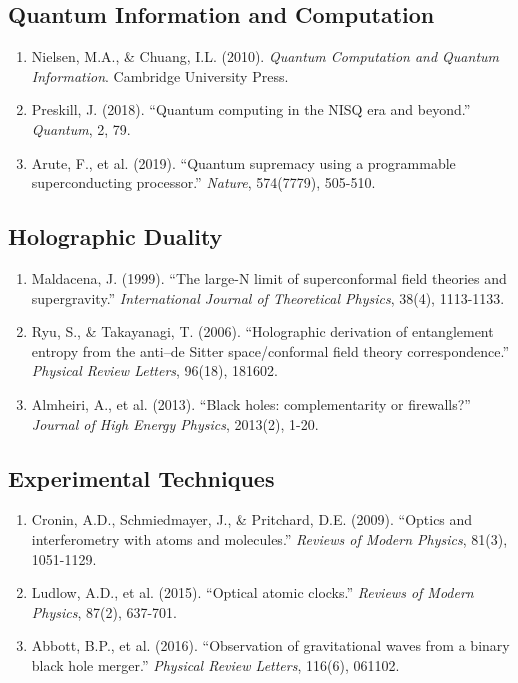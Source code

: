 \documentclass[11pt,a4paper,twoside]{article}
\begin{document}
\subsection{Quantum Information and Computation}

\begin{enumerate}[leftmargin=*,start=17]
    \item Nielsen, M.A., \& Chuang, I.L. (2010). \textit{Quantum Computation and Quantum Information}. Cambridge University Press.

    \item Preskill, J. (2018). ``Quantum computing in the NISQ era and beyond.'' \textit{Quantum}, 2, 79.

    \item Arute, F., et al. (2019). ``Quantum supremacy using a programmable superconducting processor.'' \textit{Nature}, 574(7779), 505-510.
\end{enumerate}

\subsection{Holographic Duality}

\begin{enumerate}[leftmargin=*,start=20]
    \item Maldacena, J. (1999). ``The large-N limit of superconformal field theories and supergravity.'' \textit{International Journal of Theoretical Physics}, 38(4), 1113-1133.

    \item Ryu, S., \& Takayanagi, T. (2006). ``Holographic derivation of entanglement entropy from the anti--de Sitter space/conformal field theory correspondence.'' \textit{Physical Review Letters}, 96(18), 181602.

    \item Almheiri, A., et al. (2013). ``Black holes: complementarity or firewalls?'' \textit{Journal of High Energy Physics}, 2013(2), 1-20.
\end{enumerate}

\subsection{Experimental Techniques}

\begin{enumerate}[leftmargin=*,start=23]
    \item Cronin, A.D., Schmiedmayer, J., \& Pritchard, D.E. (2009). ``Optics and interferometry with atoms and molecules.'' \textit{Reviews of Modern Physics}, 81(3), 1051-1129.

    \item Ludlow, A.D., et al. (2015). ``Optical atomic clocks.'' \textit{Reviews of Modern Physics}, 87(2), 637-701.

    \item Abbott, B.P., et al. (2016). ``Observation of gravitational waves from a binary black hole merger.'' \textit{Physical Review Letters}, 116(6), 061102.
\end{enumerate}
\end{document}
